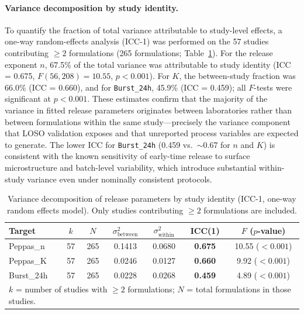 \documentclass[preprint,12pt,authoryear]{elsarticle}
\begin{document}
\paragraph{Variance decomposition by study identity.}
To quantify the fraction of total variance attributable to study-level effects, a one-way random-effects analysis (ICC-1) was performed on the 57 studies contributing $\geq 2$ formulations (265 formulations; Table~\ref{tab:icc}). For the release exponent $n$, 67.5\% of the total variance was attributable to study identity (ICC = 0.675, $F(56, 208) = 10.55$, $p < 0.001$). For $K$, the between-study fraction was 66.0\% (ICC = 0.660), and for \texttt{Burst\_24h}, 45.9\% (ICC = 0.459); all $F$-tests were significant at $p < 0.001$. These estimates confirm that the majority of the variance in fitted release parameters originates between laboratories rather than between formulations within the same study---precisely the variance component that LOSO validation exposes and that unreported process variables are expected to generate. The lower ICC for \texttt{Burst\_24h} (0.459 vs.\ $\sim$0.67 for $n$ and $K$) is consistent with the known sensitivity of early-time release to surface microstructure and batch-level variability, which introduce substantial within-study variance even under nominally consistent protocols.


\begin{table}[H]
\centering
\caption{Variance decomposition of release parameters by study identity (ICC-1, one-way random effects model). Only studies contributing $\geq 2$ formulations are included.}
\label{tab:icc}
\begin{tabular}{lcccccc}
\toprule
Target & $k$ & $N$ & $\sigma^2_{\text{between}}$ & $\sigma^2_{\text{within}}$ & ICC(1) & $F$ ($p$-value) \\
\midrule
Peppas\_n & 57 & 265 & 0.1413 & 0.0680 & \textbf{0.675} & 10.55 ($< 0.001$) \\
Peppas\_K & 57 & 265 & 0.0246 & 0.0127 & \textbf{0.660} & 9.92 ($< 0.001$) \\
Burst\_24h & 57 & 265 & 0.0228 & 0.0268 & \textbf{0.459} & 4.89 ($< 0.001$) \\
\bottomrule
\multicolumn{7}{l}{\footnotesize $k$ = number of studies with $\geq 2$ formulations; $N$ = total formulations in those studies.} \\
\end{tabular}
\end{table}
\end{document}
